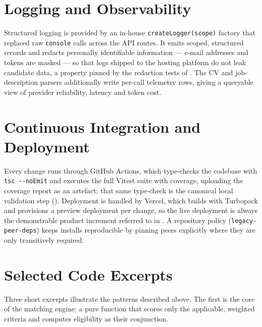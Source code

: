 
\section{Logging and Observability}
\label{sec:impl-observability}

Structured logging is provided by an in-house \texttt{createLogger(scope)}
factory that replaced raw \texttt{console} calls across the API routes. It
emits scoped, structured records and redacts personally identifiable
information --- e-mail addresses and tokens are masked --- so that logs
shipped to the hosting platform do not leak candidate data, a property pinned
by the redaction tests of . The CV and
job-description parsers additionally write per-call telemetry rows, giving a
queryable view of provider reliability, latency and token cost.


\section{Continuous Integration and Deployment}
\label{sec:impl-cicd}

Every change runs through GitHub Actions, which type-checks the codebase with
\texttt{tsc -{}-noEmit} and executes the full Vitest suite with coverage,
uploading the coverage report as an artefact; that same type-check is the
canonical local validation step (). Deployment is handled by Vercel, which
builds with Turbopack and provisions a preview deployment per change, so the
live deployment is always the demonstrable product increment referred to in
. A repository policy (\texttt{legacy-peer-deps})
keeps installs reproducible by pinning peers explicitly where they are only
transitively required.


\section{Selected Code Excerpts}
\label{sec:impl-code}

Three short excerpts illustrate the patterns described above. The first is
the core of the matching engine: a pure function that scores only the
applicable, weighted criteria and computes eligibility as their conjunction.

